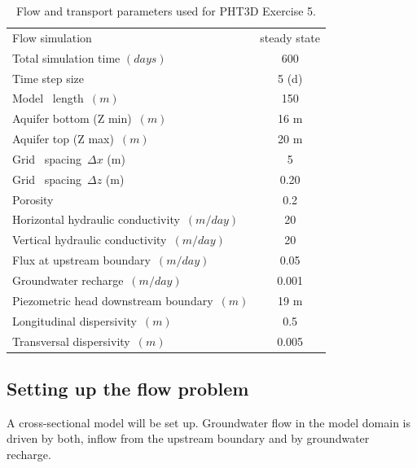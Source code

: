 \begin{table}
\caption{Flow and transport parameters used for PHT3D Exercise 5.}
\begin{center}
\begin{tabular}{lc} \hline
Flow simulation                     & steady state \\
Total simulation time $(days)$       & 600 \\
Time step size          & 5 (d) \\
Model \  length\     $ (m)                $         &  150            \\
Aquifer bottom (Z min)\            $(m)        $         &  16 m          \\
Aquifer top (Z max)\               $(m)        $         &  20 m          \\

Grid \ spacing\      $\Delta x $ (m)                &    5            \\
Grid \ spacing\      $\Delta z $ (m)                &    0.20         \\
Porosity\            $            $         &  0.2           \\
Horizontal hydraulic conductivity\ $(m/day)           $         & 20         \\ 
Vertical   hydraulic conductivity\ $ (m/day)           $         & 20       \\ 
Flux at upstream boundary\ $(m/day)          $         &  0.05          \\ 
Groundwater recharge\ $(m/day)          $         &  0.001          \\ 
Piezometric head downstream boundary\ $(m)        $         &  19 m          \\ 
Longitudinal dispersivity\ $(m)         $         &  0.5          \\  
Transversal  dispersivity\ $(m)         $         &  0.005          \\ \hline

\end{tabular}
\label{edenhill_flow}
\end{center}
\end{table}

\subsection[Setting up the flow problem]{Setting up the flow problem}

A cross-sectional model will be set up. Groundwater flow in the model domain is 
driven by both, inflow from the upstream boundary and by groundwater recharge. 

